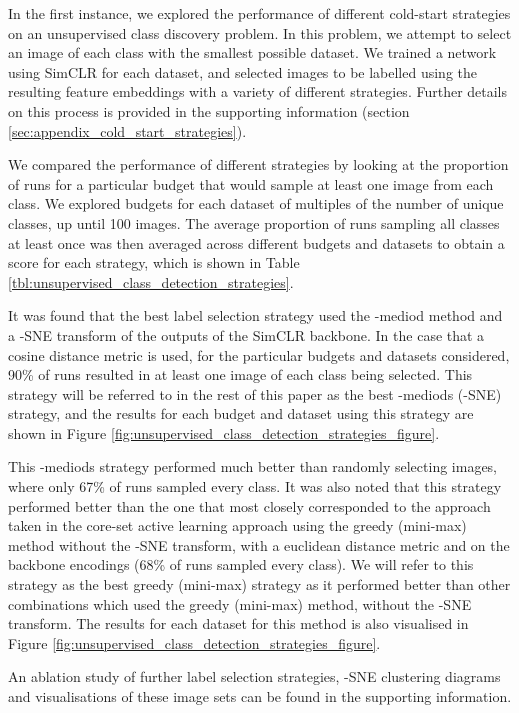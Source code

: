 \documentclass{article}
\begin{document}
In the first instance, we explored the performance of different cold-start strategies on an unsupervised class discovery problem. In this problem, we attempt to select an image of each class with the smallest possible dataset. We trained a network using SimCLR for each dataset, and selected images to be labelled using the resulting feature embeddings with a variety of different strategies. Further details on this process is provided in the supporting information (section \ref{sec:appendix_cold_start_strategies}).

We compared the performance of different strategies by looking at the proportion of runs for a particular budget that would sample at least one image from each class. We explored budgets for each dataset of multiples of the number of unique classes, up until 100 images. The average proportion of runs sampling all classes at least once was then averaged across different budgets and datasets to obtain a score for each strategy, which is shown in Table \ref{tbl:unsupervised_class_detection_strategies}.

It was found that the best label selection strategy used the -mediod method and a -SNE transform of the outputs of the SimCLR backbone. In the case that a cosine distance metric is used, for the particular budgets and datasets considered, 90\% of runs resulted in at least one image of each class being selected. This strategy will be referred to in the rest of this paper as the best -mediods (-SNE) strategy, and the results for each budget and dataset using this strategy are shown in Figure \ref{fig:unsupervised_class_detection_strategies_figure}. 

This -mediods strategy performed much better than randomly selecting images, where only 67\% of runs sampled every class. It was also noted that this strategy performed better than the one that most closely corresponded to the approach taken in the core-set active learning approach \citep{sener2017active} \textemdash{} using the greedy (mini-max) method without the -SNE transform, with a euclidean distance metric and on the backbone encodings (68\% of runs sampled every class). We will refer to this strategy as the best greedy (mini-max) strategy as it performed better than other combinations which used the greedy (mini-max) method, without the -SNE transform. The results for each dataset for this method is also visualised in Figure \ref{fig:unsupervised_class_detection_strategies_figure}.

An ablation study of further label selection strategies, -SNE clustering diagrams and visualisations of these image sets can be found in the supporting information.
\end{document}
